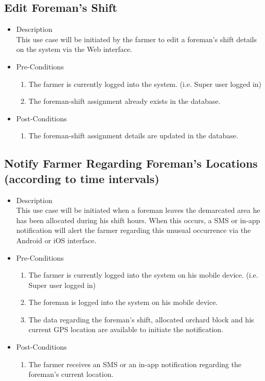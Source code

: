 \documentclass[11pt,fleqn]{book} %
\begin{document}
		\subsection{Edit Foreman’s Shift}
		\begin{itemize}
			\item Description\\
			This use case will be initiated by the farmer to edit a foreman’s shift details on the system via the Web interface.
			\item Pre-Conditions
			\begin{enumerate}
				\item The farmer is currently logged into the system. (i.e. Super user logged in)
				\item The foreman-shift assignment already exists in the database.	
			\end{enumerate}
			\item Post-Conditions
			\begin{enumerate}
				\item The foreman-shift assignment details are updated in the database.
			\end{enumerate}
		\end{itemize}
		
		\subsection{Notify Farmer Regarding Foreman’s Locations (according to time intervals)}
		\begin{itemize}
			\item Description\\
			This use case will be initiated when a foreman leaves the demarcated area he has been allocated during his shift hours. When this occurs, a SMS or in-app notification will alert the farmer regarding this unusual occurrence via the Android or iOS interface.
			\item Pre-Conditions
			\begin{enumerate}
				\item The farmer is currently logged into the system on his mobile device. (i.e. Super user logged in)
				\item The foreman is logged into the system on his mobile device.
				\item The data regarding the foreman’s shift, allocated orchard block and his current GPS location are available to initiate the notification.						
			\end{enumerate}
			\item Post-Conditions
			\begin{enumerate}
				\item The farmer receives an SMS or an in-app notification regarding the foreman’s current location.
			\end{enumerate}
		\end{itemize}
		
\end{document}
